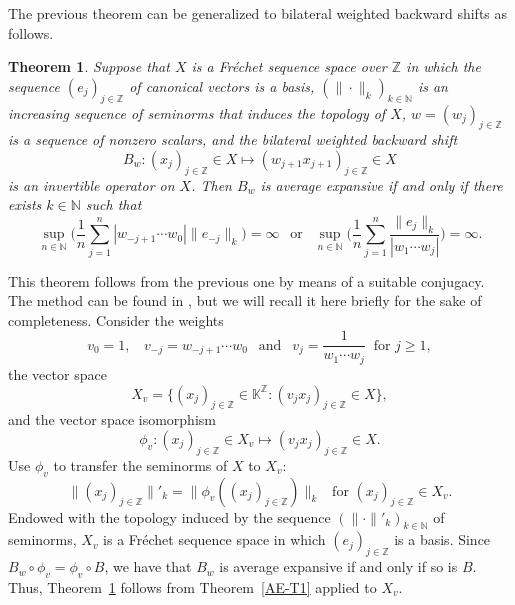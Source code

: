 \documentclass[12pt]{amsart}
\theoremstyle{theorem}
\newtheorem{theorem}{Theorem}%
\theoremstyle{definition}
\theoremstyle{remark} \theoremstyle{question} \theoremstyle{example}
\newcommand{\N}{\mathbb{N}}   %
\newcommand{\Z}{\mathbb{Z}}   %
\newcommand{\K}{\mathbb{K}}   %
\begin{document}
The previous theorem can be generalized to bilateral weighted backward shifts as follows.

\begin{theorem}\label{AE-T2}
Suppose that $X$ is a Fréchet sequence space over $\Z$ in which the sequence $(e_j)_{j \in \Z}$ of canonical vectors is a basis,
$(\|\cdot\|_k)_{k \in \N}$ is an increasing sequence of seminorms that induces the topology of $X$,
$w = (w_j)_{j \in \Z}$ is a sequence of nonzero scalars, and the bilateral weighted backward shift 
\[
B_w : (x_j)_{j \in \Z} \in X \mapsto (w_{j+1} x_{j+1})_{j \in \Z} \in X
\]
is an invertible operator on $X$. Then $B_w$ is average expansive if and only if there exists $k \in \N$ such that
\begin{equation}\label{AE-F2}
\sup_{n \in \N} \Big(\frac{1}{n} \sum_{j=1}^n |w_{-j+1} \cdots w_0| \|e_{-j}\|_k\Big) = \infty \ \ \text{ or } \ \
\sup_{n \in \N} \Big(\frac{1}{n} \sum_{j=1}^n \frac{\|e_j\|_k}{|w_1 \cdots w_j|}\Big) = \infty.
\end{equation}
\end{theorem}

\smallskip
This theorem follows from the previous one by means of a suitable conjugacy.
The method can be found in \cite[Section~4.1]{KGroAPer11}, but we will recall it here briefly for the sake of completeness.
Consider the weights
\[
v_0 = 1, \ \ \ \ v_{-j} = w_{-j+1} \cdots w_0 \ \ \text{ and } \ \ v_j = \frac{1}{w_1 \cdots w_j} \ \text{ for } j \geq 1,
\]
the vector space
\[
X_v = \{(x_j)_{j \in \Z} \in \K^\Z : (v_j x_j)_{j \in \Z} \in X\},
\]
and the vector space isomorphism
\[
\phi_v : (x_j)_{j \in \Z} \in X_v \mapsto (v_j x_j)_{j \in \Z} \in X.
\]
Use $\phi_v$ to transfer the seminorms of $X$ to $X_v$:
\[
\|(x_j)_{j \in \Z}\|'_k = \|\phi_v((x_j)_{j \in \Z})\|_k \ \ \text{ for } (x_j)_{j \in \Z} \in X_v.
\]
Endowed with the topology induced by the sequence $(\|\cdot\|'_k)_{k \in \N}$ of seminorms,
$X_v$ is a Fr\'echet sequence space in which $(e_j)_{j \in \Z}$ is a basis.
Since $B_w \circ \phi_v = \phi_v \circ B$, we have that $B_w$ is average expansive if and only if so is $B$.
Thus, Theorem~\ref{AE-T2} follows from Theorem~\ref{AE-T1} applied to $X_v$.
\end{document}
